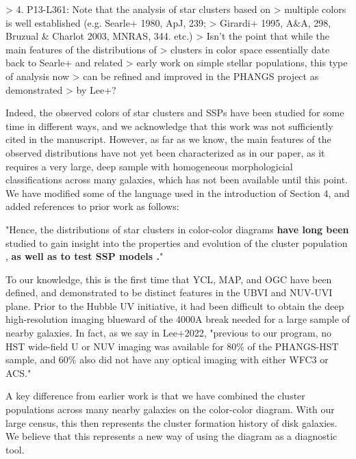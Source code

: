 > 4. P13-L361: Note that the analysis of star clusters based on
> multiple colors is well established (e.g. Searle+ 1980, ApJ, 239; 
> Girardi+ 1995, A\&A, 298, Bruzual \& Charlot 2003, MNRAS, 344. etc.)
> Isn't the point that while the main features of the distributions of
> clusters in color space essentially date back to Searle+ and related
> early work on simple stellar populations, this type of analysis now
> can be refined and improved in the PHANGS project as demonstrated 
> by Lee+?

Indeed, the observed colors of star clusters and SSPs have been studied for some time in different ways, and we acknowledge that this work was not sufficiently cited in the manuscript. However, as far as we know, the main features of the observed distributions have not yet been characterized as in our paper, as it requires a very large, deep sample with homogeneous morphologicial classifications across many galaxies, which has not been available until this point.  We have modified some of the language used in the introduction of Section 4, and added references to prior work as follows:

"Hence, the distributions of star clusters in color-color diagrams \textbf{have long been} studied to gain insight into the properties and evolution of the cluster population \citep[e.g.,][]{van_den_bergh_ubv_1968, searle_classification_1980, girardi_age_1995, larsen_young_1999, chandar_luminosity_2010, adamo_legacy_2017}, 
\textbf{as well as to test SSP models \citep[e.g.,][]{bruzual_stellar_2003,vazquez_optimization_2005,maraston_evolutionary_1998}.}"

To our knowledge, this is the first time that YCL, MAP, and OGC have been defined, and demonstrated to be distinct features in the UBVI and NUV-UVI plane.   Prior to the Hubble UV initiative, it had been difficult to obtain the deep high-resolution imaging blueward of the 4000A break needed for a large sample of nearby galaxies.  In fact, as we say in Lee+2022, "previous to our program, no HST wide-field U or NUV imaging was available for 80\% of the PHANGS-HST sample, and 60\% also did not have any optical imaging with either WFC3 or ACS."  

A key difference from earlier work is that we have combined the cluster populations across many nearby galaxies on the color-color diagram.  With our large census, this then represents the cluster formation history of disk galaxies.  We believe that this represents a new way of using the diagram as a diagnostic tool.


